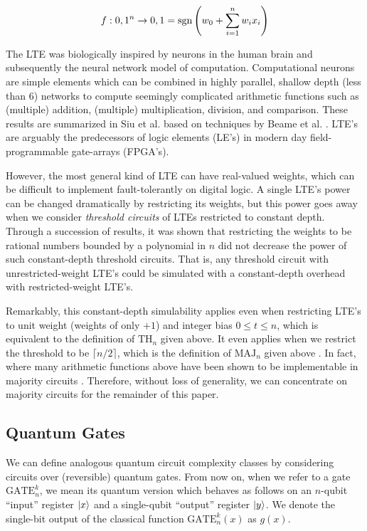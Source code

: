\begin{equation}
f:{0,1}^n \rightarrow {0,1} = \text{sgn}\left( w_0 + \sum_{i=1}^n w_i x_i \right)
\end{equation}

The LTE was biologically inspired by neurons in the human brain and
subsequently the neural network model of computation. Computational
neurons are simple elements which can be combined in highly parallel,
shallow depth (less than $6$) networks to compute seemingly complicated
arithmetic functions such as (multiple) addition, (multiple) multiplication,
division, and comparison. These results are summarized in Siu et al. \cite{Siu1993}
based on techniques by Beame et al. \cite{Beame1986}. LTE's are arguably the
predecessors of logic elements (LE's) in modern day field-programmable
gate-arrays (FPGA's).

However, the most general kind of LTE can have real-valued weights,
which can be difficult to implement fault-tolerantly on digital logic.
A single LTE's power can be changed dramatically by restricting
its weights, but this power goes away when we consider \emph{threshold circuits}
of LTEs restricted to constant depth.
Through a succession of results, it was shown that restricting the weights
to be rational numbers bounded by a polynomial in $n$ \cite{Siu1991a}
did not decrease the power of such constant-depth threshold circuits.
That is, any threshold circuit with unrestricted-weight LTE's could be simulated
with a constant-depth overhead with restricted-weight LTE's.

Remarkably, this constant-depth simulability applies even when restricting
LTE's to unit weight (weights of only $+1$) and integer bias $0 \le t \le n$,
which is equivalent to the definition of $\text{TH}_n$ given above. It
even applies when we restrict the threshold to be $\lceil n/2 \rceil$, which
is the definition of $\text{MAJ}_n$ given above \cite{Goldmann1994}.
In fact, where many arithmetic functions above have been shown to
be implementable in majority circuits \cite{Reif1992,Yeh1996}.
Therefore, without loss of generality, we can concentrate on
majority circuits for the remainder of this paper.

\subsection{Quantum Gates}

We can define analogous quantum circuit complexity classes by
considering circuits over (reversible) quantum gates. From
now on, when we refer to a gate $\text{GATE}^k_n$, we mean
its quantum version which behaves as follows on an $n$-qubit
``input'' register $\left\vert{x}\right\rangle$ and a single-qubit ``output''
register $\left\vert{y}\right\rangle$. We denote the single-bit output of the
classical function $\text{GATE}^k_n(x)$ as $g(x)$.

